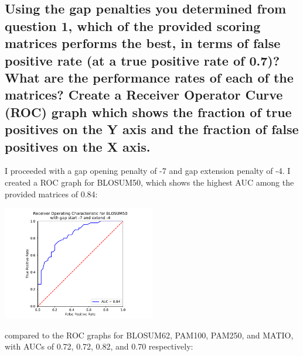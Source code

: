 \documentclass[]{article}
\begin{document}
\subsection{Using the gap penalties you determined from question 1, which of the provided scoring matrices performs the best, in terms of false positive rate (at a true positive rate of 0.7)? What are the performance rates of each of the matrices? Create a Receiver Operator Curve (ROC) graph which shows the fraction of true positives on the Y axis and the fraction of false positives on the X axis.}

I proceeded with a gap opening penalty of -7 and gap extension penalty of -4. I created a ROC graph for BLOSUM50, which shows the highest AUC among the provided matrices of 0.84:

\vspace{1em}
\includegraphics[width=0.5\textwidth]{../BMI203_HW3_alignment/plots/ROC_blosum50.pdf}
\vspace{1em}

compared to the ROC graphs for BLOSUM62, PAM100, PAM250, and MATIO, with AUCs of 0.72, 0.72, 0.82, and 0.70 respectively:
\end{document}

